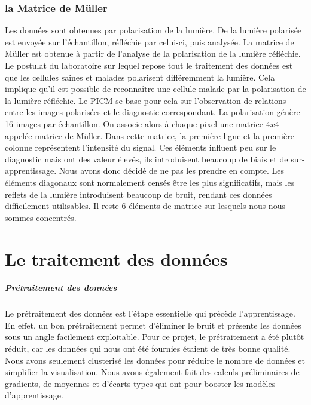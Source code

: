 \documentclass[a4paper,10pt]{report}
\begin{document}
\subsection{la Matrice de Müller}
Les données sont obtenues par polarisation de la lumière. De la lumière polarisée est envoyée sur l'échantillon, réfléchie par celui-ci, puis analysée.
La matrice de Müller est obtenue à partir de l'analyse de la polarisation de la lumière réfléchie. Le postulat du laboratoire sur lequel repose tout le traitement des données est que les cellules saines et malades polarisent différemment la lumière. Cela implique qu'il est possible de reconnaître une cellule malade par la polarisation de la lumière réfléchie.
Le PICM se base pour cela sur l’observation de relations entre les images polarisées et le diagnostic correspondant. 
La polarisation génère 16 images par échantillon. On associe alors à chaque pixel une matrice $4x4$ appelée matrice de Müller. Dans cette matrice, la première ligne et la première colonne représentent l'intensité du signal. Ces éléments influent peu sur le diagnostic mais ont des valeur élevés, ils introduisent beaucoup de biais et de sur-apprentissage. Nous avons donc décidé de ne pas les prendre en compte. Les éléments diagonaux sont normalement censés être les plus significatifs, mais les reflets de la lumière introduisent beaucoup de bruit, rendant ces données difficilement utilisables. Il reste 6 éléments de matrice sur lesquels nous nous sommes concentrés. 


\chapter{Le traitement des données}

\paragraph{Prétraitement des données}
Le prétraitement des données est l'étape essentielle qui précède l'apprentissage. En effet, un bon prétraitement permet d'éliminer le bruit et présente les données sous un angle facilement exploitable. Pour ce projet, le prétraitement a été plutôt réduit, car les données qui nous ont été fournies étaient de très bonne qualité. Nous avons seulement clusterisé les données pour réduire le nombre de données et simplifier la visualisation.
Nous avons également fait des calculs préliminaires de gradients, de moyennes et d’écarts-types qui ont pour booster les modèles d'apprentissage.
\end{document}
